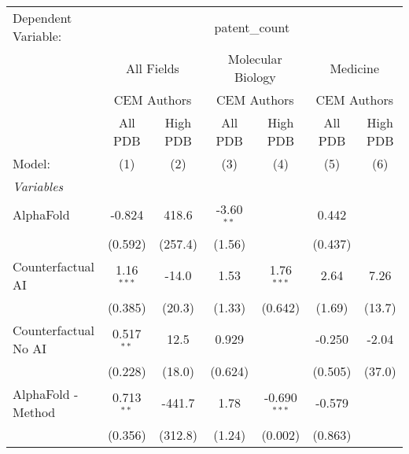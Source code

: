 \begingroup
\centering
\begin{tabular}{lcccccc}
   \tabularnewline \midrule \midrule
   Dependent Variable: & \multicolumn{6}{c}{patent\_count}\\
 & \multicolumn{2}{c}{All Fields} & \multicolumn{2}{c}{Molecular Biology} & \multicolumn{2}{c}{Medicine} \\
\cmidrule(lr){2-3} \cmidrule(lr){4-5} \cmidrule(lr){6-7}
 & \multicolumn{2}{c}{CEM Authors} & \multicolumn{2}{c}{CEM Authors} & \multicolumn{2}{c}{CEM Authors} \\
\cmidrule(lr){2-3} \cmidrule(lr){4-5} \cmidrule(lr){6-7}
 & \multicolumn{1}{c}{All PDB} & \multicolumn{1}{c}{High PDB} & \multicolumn{1}{c}{All PDB} & \multicolumn{1}{c}{High PDB} & \multicolumn{1}{c}{All PDB} & \multicolumn{1}{c}{High PDB} \\
\cmidrule(lr){2-2} \cmidrule(lr){3-3} \cmidrule(lr){4-4} \cmidrule(lr){5-5} \cmidrule(lr){6-6} \cmidrule(lr){7-7}
   Model:                                                     & (1)           & (2)     & (3)          & (4)            & (5)           & (6)\\  
   \midrule
   \emph{Variables}\\
   AlphaFold                                                  & -0.824        & 418.6   & -3.60$^{**}$ &                & 0.442         &   \\   
                                                              & (0.592)       & (257.4) & (1.56)       &                & (0.437)       &   \\   
   Counterfactual AI                                          & 1.16$^{***}$  & -14.0   & 1.53         & 1.76$^{***}$   & 2.64          & 7.26\\   
                                                              & (0.385)       & (20.3)  & (1.33)       & (0.642)        & (1.69)        & (13.7)\\   
   Counterfactual No AI                                       & 0.517$^{**}$  & 12.5    & 0.929        &                & -0.250        & -2.04\\   
                                                              & (0.228)       & (18.0)  & (0.624)      &                & (0.505)       & (37.0)\\   
   AlphaFold - Method                                         & 0.713$^{**}$  & -441.7  & 1.78         & -0.690$^{***}$ & -0.579        &   \\   
                                                              & (0.356)       & (312.8) & (1.24)       & (0.002)        & (0.863)       &   \\   

\end{tabular}
